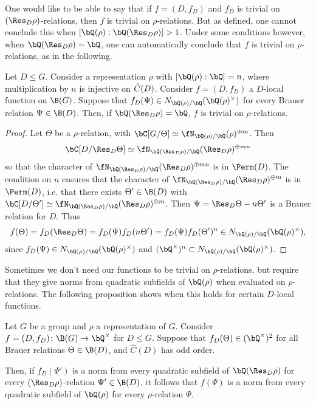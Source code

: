  One would like to be able to say that if $f = (D, f_D)$ and $f_D$ is trivial on $(\Res_D \rho)$-relations, then $f$ is trivial on $\rho$-relations. But as defined, one cannot conclude this when $[\bQ(\rho) : \bQ(\Res_D \rho) ] > 1$. Under some conditions however, when $\bQ(\Res_D \rho) = \bQ$, one can automatically conclude that $f$ is trivial on $\rho$-relations, as in the following.

\begin{prop}\label{rational-res}
Let $D \leq G$. Consider a representation $\rho$ with $[\bQ(\rho) : \bQ] = n$, where multiplication by $n$ is injective on $\hat{C}(D)$. Consider $f = (D, f_D)$ a $D$-local function on $\B(G)$. 
Suppose that $f_D(\Psi) \in \fieldnorm{\rho}$ for every Brauer relation $\Psi \in \B(D)$.
Then, if $\bQ(\Res_D \rho) = \bQ$, $f$ is trivial on $\rho$-relations.
\end{prop}

\begin{proof}
    Let $\Theta$ be a $\rho$-relation, with $\bC[G / \Theta] \simeq \repnorm{\rho}^{\oplus m}$. Then $$\bC[D / \Res_D \Theta] \simeq \repnorm{\Res_D \rho}^{\oplus m n}$$
    so that the character of $\repnorm{\Res_D \rho}^{\oplus m n}$ is in $\Perm(D)$.
    The condition on $n$ ensures that the character of $\repnorm{\Res_D \rho}^{\oplus m}$ is in $\Perm(D)$, i.e. that there exists $\Theta' \in \B(D)$ with $\bC[D / \Theta'] \simeq \repnorm{\Res_D \rho}^{\oplus m}.$ Then $\Psi = \Res_D\Theta - n\Theta'$ is a Brauer relation for $D$. Thus
    \[ f(\Theta) = f_D(\Res_D \Theta) = f_D(\Psi)f_D(n\Theta') = f_D(\Psi)f_D(\Theta')^n \in \fieldnorm{\rho}, \]
    since $f_D(\Psi) \in \fieldnorm{\rho}$ and $(\bQ^{\times})^n \subset \fieldnorm{\rho}$. 
\end{proof}

Sometimes we don't need our functions to be trivial on $\rho$-relations, but require that they give norms from quadratic subfields of $\bQ(\rho)$ when evaluated on $\rho$-relations. The following proposition shows when this holds for certain $D$-local functions.

\begin{prop}
Let $G$ be a group and $\rho$ a representation of $G$. Consider $f = (D, f_D) \colon \B(G) \to \bQ^{\times}$ for $D \leq G$. Suppose that $f_D(\Theta) \in (\bQ^{\times})^2$ for all Brauer relations $\Theta \in \B(D)$, and $\hat{C}(D)$ has odd order.

Then, if $f_D(\Psi')$ is a norm from every quadratic subfield of $\bQ(\Res_D \rho)$ for every $(\Res_D \rho)$-relation $\Psi' \in \B(D)$, it follows that $f(\Psi)$ is a norm from every quadratic subfield of $\bQ(\rho)$ for every $\rho$-relation $\Psi$. 
\end{prop}

